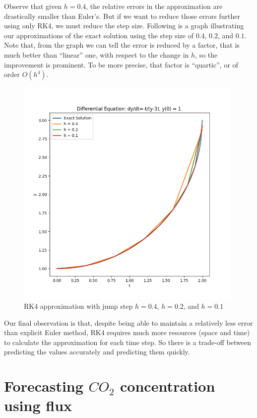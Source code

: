 \documentclass[a4paper]{article}
\begin{document}
Observe that given \(h = 0.4\), the relative errors in the approximation are drastically smaller than Euler's. But if we want to reduce those errors further using only RK4, we must reduce the step size. Following is a graph illustrating our approximations of the exact solution using the step size of \(0.4\), \(0.2\), and \(0.1\). Note that, from the graph we can tell the error is reduced by a factor, that is much better than ``linear'' one, with respect to the change in \(h\), so the improvement is prominent. To be more precise, that factor is ``quartic'', or of order \(O(h^4)\).

\begin{figure}[H]
  \centering
  \includegraphics[width=11cm]{plot_runge_kutta.png}
  \caption{RK4 approximation with jump step \(h = 0.4\), \(h = 0.2\), and \(h = 0.1\)}
\end{figure}

Our final observation is that, despite being able to maintain a relatively less error than explicit Euler method, RK4 requires much more resources (space and time) to calculate the approximation for each time step. So there is a trade-off between predicting the values accurately and predicting them quickly.

\newpage
\section{Forecasting \texorpdfstring{\(CO_2\)}{} concentration using flux}
\end{document}
